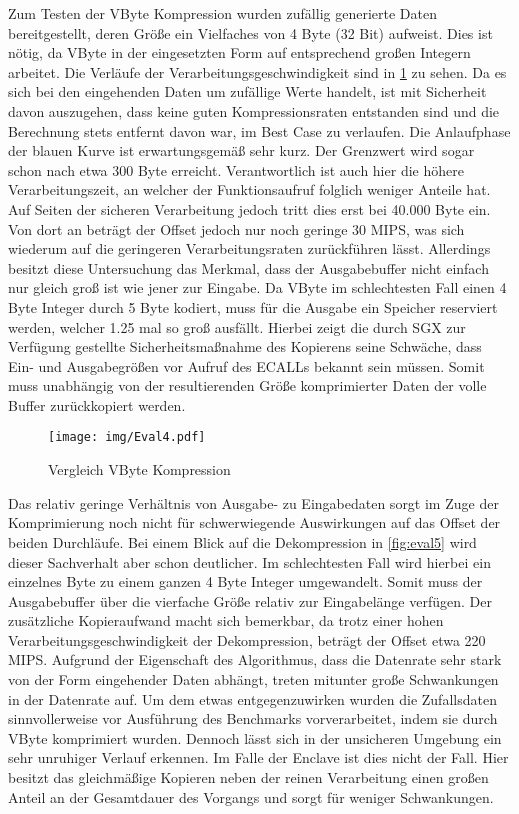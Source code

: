 Zum Testen der VByte Kompression wurden zufällig generierte Daten bereitgestellt, deren Größe ein Vielfaches von 4 Byte (32 Bit) aufweist. Dies ist nötig, da VByte in der eingesetzten Form auf entsprechend großen Integern arbeitet. Die Verläufe der Verarbeitungsgeschwindigkeit sind in \ref{fig:eval4} zu sehen. Da es sich bei den eingehenden Daten um zufällige Werte handelt, ist mit Sicherheit davon auszugehen, dass keine guten Kompressionsraten entstanden sind und die Berechnung stets entfernt davon war, im Best Case zu verlaufen. Die Anlaufphase der blauen Kurve ist erwartungsgemäß sehr kurz. Der Grenzwert wird sogar schon nach etwa 300 Byte erreicht. Verantwortlich ist auch hier die höhere Verarbeitungszeit, an welcher der Funktionsaufruf folglich weniger Anteile hat. Auf Seiten der sicheren Verarbeitung jedoch tritt dies erst bei 40.000 Byte ein. Von dort an beträgt der Offset jedoch nur noch geringe 30 MIPS, was sich wiederum auf die geringeren Verarbeitungsraten zurückführen lässt. Allerdings besitzt diese Untersuchung das Merkmal, dass der Ausgabebuffer nicht einfach nur gleich groß ist wie jener zur Eingabe. Da VByte im schlechtesten Fall einen 4 Byte Integer durch 5 Byte kodiert, muss für die Ausgabe ein Speicher reserviert werden, welcher 1.25 mal so groß ausfällt. Hierbei zeigt die durch SGX zur Verfügung gestellte Sicherheitsmaßnahme des Kopierens seine Schwäche, dass Ein- und Ausgabegrößen vor Aufruf des ECALLs bekannt sein müssen. Somit muss unabhängig von der resultierenden Größe komprimierter Daten der volle Buffer zurückkopiert werden.

\begin{figure}[h]
	\texttt{[image: img/Eval4.pdf]}
	\centering
	\caption{Vergleich VByte Kompression}
	\label{fig:eval4}
\end{figure}

Das relativ geringe Verhältnis von Ausgabe- zu Eingabedaten sorgt im Zuge der Komprimierung noch nicht für schwerwiegende Auswirkungen auf das Offset der beiden Durchläufe. Bei einem Blick auf die Dekompression in \ref{fig:eval5} wird dieser Sachverhalt aber schon deutlicher. Im schlechtesten Fall wird hierbei ein einzelnes Byte zu einem ganzen 4 Byte Integer umgewandelt. Somit muss der Ausgabebuffer über die vierfache Größe relativ zur Eingabelänge verfügen. Der zusätzliche Kopieraufwand macht sich bemerkbar, da trotz einer hohen Verarbeitungsgeschwindigkeit der Dekompression, beträgt der Offset etwa 220 MIPS. Aufgrund der Eigenschaft des Algorithmus, dass die Datenrate sehr stark von der Form eingehender Daten abhängt, treten mitunter große Schwankungen in der Datenrate auf. Um dem etwas entgegenzuwirken wurden die Zufallsdaten sinnvollerweise vor Ausführung des Benchmarks vorverarbeitet, indem sie durch VByte komprimiert wurden. Dennoch lässt sich in der unsicheren Umgebung ein sehr unruhiger Verlauf erkennen. Im Falle der Enclave ist dies nicht der Fall. Hier besitzt das gleichmäßige Kopieren neben der reinen Verarbeitung einen großen Anteil an der Gesamtdauer des Vorgangs und sorgt für weniger Schwankungen.

